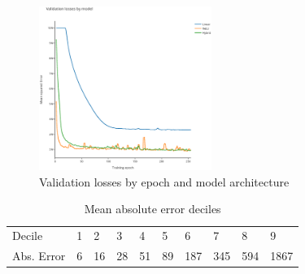\documentclass[conference]{IEEEtran}
\begin{document}
\begin{figure}[h]
    \caption{Validation losses by epoch and model architecture}
    \centering
    \includegraphics[width=0.5\textwidth]{figures/losses.eps}
\end{figure}

\begin{table}[]
    \caption{Mean absolute error deciles}
    \centering
    \begin{tabular}{llllllllll}
    Decile     & 1    & 2     & 3     & 4     & 5     & 6      & 7      & 8      & 9       \\
    Abs. Error & 6 & 16 & 28 & 51 & 89 & 187 & 345 & 594 & 1867
    \end{tabular}
\end{table}



\end{document}

